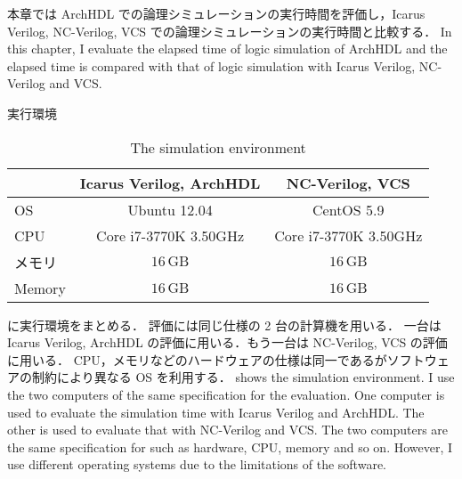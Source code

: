 本章では ArchHDL での論理シミュレーションの実行時間を評価し，Icarus Verilog, NC-Verilog, VCS での論理シミュレーションの実行時間と比較する．
\fi
In this chapter, I evaluate the elapsed time of logic simulation of ArchHDL and the elapsed time is compared with that of logic simulation with Icarus Verilog, NC-Verilog and VCS.

\begin{table}[t]
 \caption{実行環境}
\fi
 \caption{The simulation environment}
 \label{table:exec_env}
 \begin{center}
  \begin{tabular}{l|c|c} \hline
         &  Icarus Verilog, ArchHDL  &  NC-Verilog, VCS   \\ \hline
  OS     &  Ubuntu 12.04             &  CentOS 5.9        \\
  CPU    &  Core i7-3770K 3.50GHz   &  Core i7-3770K 3.50GHz  \\
\if0
  メモリ  &  $16\,\mathrm{GB}$       &  $16\,\mathrm{GB}$  \\ \hline
\fi
   Memory &  $16\,\mathrm{GB}$       &  $16\,\mathrm{GB}$  \\ \hline
  \end{tabular}
 \end{center}
\end{table}

 に実行環境をまとめる．
評価には同じ仕様の 2 台の計算機を用いる．
一台は Icarus Verilog, ArchHDL の評価に用いる．もう一台は NC-Verilog, VCS の評価に用いる．
CPU，メモリなどのハードウェアの仕様は同一であるがソフトウェアの制約により異なる OS を利用する．
\fi
{} shows the simulation environment.
I use the two computers of the same specification for the evaluation.
One computer is used to evaluate the simulation time with Icarus Verilog and ArchHDL.
The other is used to evaluate that with NC-Verilog and VCS.
The two computers are the same specification for such as hardware, CPU, memory and so on.
However, I use different operating systems due to the limitations of the software.

